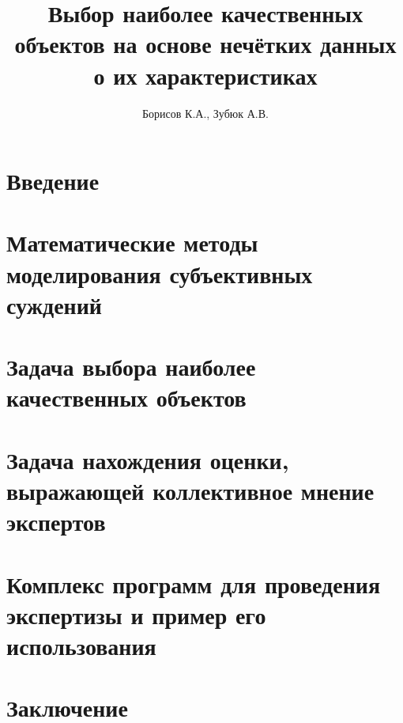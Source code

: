 \documentclass[14pt]{extarticle}
\begin{document}

\thispagestyle{empty}			

\title{Выбор наиболее качественных объектов на основе нечётких данных о их характеристиках} 
\author{Борисов К.А., Зубюк А.В.}
\maketitle

\tableofcontents
\clearpage

\section{Введение} 

\clearpage

\section{Математические методы моделирования субъективных суждений}

\clearpage

\section{Задача выбора наиболее качественных объектов}
 
\clearpage

\section{Задача нахождения оценки, выражающей коллективное мнение экспертов}

\clearpage

\section{Комплекс программ для проведения экспертизы и пример его использования }

\clearpage

\section{Заключение}
 
\clearpage
 
\printbibliography[heading=bibintoc]
\end{document}
